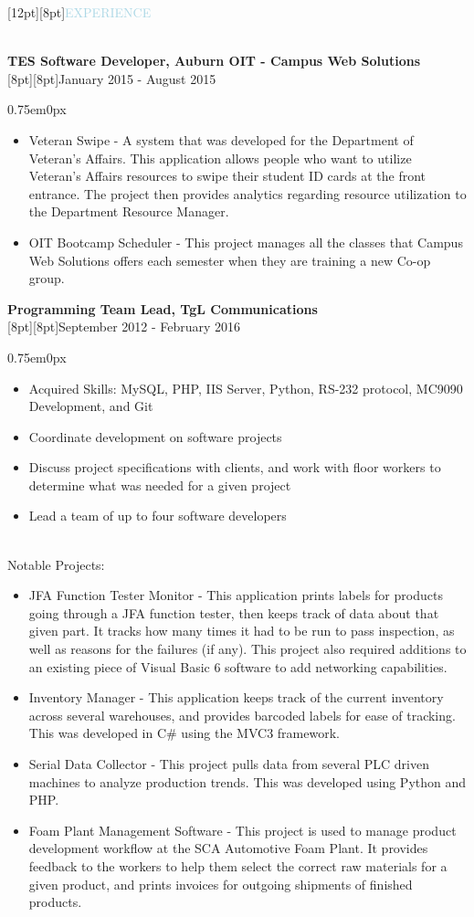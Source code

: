 \documentclass{res}
\newenvironment{ResumeBlock}[1]
{
	\begin{normalsize}
		\raisebox{0pt}[12pt][8pt]{\textcolor{lightblue}{#1}}
	\end{normalsize}
	\\
}
{	
}
\newenvironment{DetailsBlock}[2]
{
	\textbf{\color{darkfont}#1}
	\\
	\raisebox{0pt}[8pt][8pt]{#2}
	\begin{adjustwidth}{0.75em}{0px}
}
{	
	\end{adjustwidth}
}
\begin{document}
\begin{ResumeBlock}{EXPERIENCE}
\begin{DetailsBlock}{TES Software Developer, Auburn OIT - Campus Web Solutions}{January 2015 - August 2015}
\begin{itemize}
				\item Veteran Swipe - A system that was developed for the Department of Veteran's Affairs.  This application allows people who want to utilize Veteran's Affairs resources to swipe their student ID cards at the front entrance.  The project then provides analytics regarding resource utilization to the Department Resource Manager.
				\item OIT Bootcamp Scheduler - This project manages all the classes that Campus Web Solutions offers each semester when they are training a new Co-op group. 
			\end{itemize}
		\end{DetailsBlock}		
		\begin{DetailsBlock}{Programming Team Lead, TgL Communications}{September 2012 - February 2016}
			\begin{itemize}
				\item Acquired Skills:  MySQL, PHP, IIS Server, Python, RS-232 protocol, MC9090 Development, and Git 
				\item Coordinate development on software projects 
				\item Discuss project specifications with clients, and work with floor workers to determine what was needed for a given project 
				\item Lead a team of up to four software developers 
			\end{itemize}
			~\\
			Notable Projects:
			\begin{itemize}
				\item JFA Function Tester Monitor - This application prints labels for products going through a JFA function tester, then keeps track of data about that given part.  It tracks how many times it had to be run to pass inspection, as well as reasons for the failures (if any).  This project also required additions to an existing piece of Visual Basic 6 software to add networking capabilities.
				\item Inventory Manager - This application keeps track of the current inventory across several warehouses, and provides barcoded labels for ease of tracking.  This was developed in C\# using the MVC3 framework. 
				\item Serial Data Collector - This project pulls data from several PLC driven machines to analyze production trends.  This was developed using Python and PHP. 
				\item Foam Plant Management Software - This project is used to manage product development workflow at the SCA Automotive Foam Plant.  It provides feedback to the workers to help them select the correct raw materials for a given product, and prints invoices for outgoing shipments of finished products.   

\end{itemize}
\end{DetailsBlock}
\end{ResumeBlock}
\end{document}
